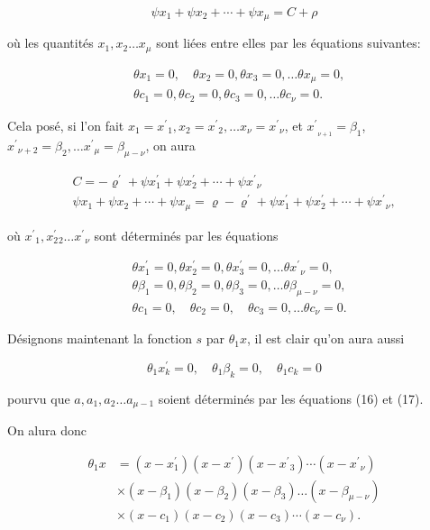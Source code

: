 \documentclass{article}
\begin{document}
\[
\psi x_{1}+\psi x_{2}+\cdots+\psi x_{\mu}=C+\rho
\]

où les quantités \(x_{1}, x_{2} \ldots x_{\mu}\) sont liées entre elles par les équations suivantes:

\[
\begin{aligned}
& \theta x_{1}=0, \quad \theta x_{2}=0, \theta x_{3}=0, \ldots \theta x_{\mu}=0, \\
& \theta c_{1}=0, \theta c_{2}=0, \theta c_{3}=0, \ldots \theta c_{\nu}=0 .
\end{aligned}
\]

Cela posé, si l'on fait \(x_{1}=x^{\prime}{ }_{1}, x_{2}=x^{\prime}{ }_{2}, \ldots x_{\nu}=x^{\prime}{ }_{\nu}\), et \({x^{\prime}}_{{ }_{\nu+1}}=\beta_{1}\), \(x^{\prime}{ }_{\nu+2}=\beta_{2}, \ldots x^{\prime}{ }_{\mu}=\beta_{\mu-\nu}\), on aura

\[
\begin{gathered}
C=-\varrho^{\prime}+\psi x_{1}^{\prime}+\psi x_{2}^{\prime}+\cdots+\psi x^{\prime}{ }_{\nu} \\
\psi x_{1}+\psi x_{2}+\cdots+\psi x_{\mu}=\varrho-\varrho^{\prime}+\psi x_{1}^{\prime}+\psi x_{2}^{\prime}+\cdots+\psi x^{\prime}{ }_{\nu},
\end{gathered}
\]

où \(x^{\prime}{ }_{1}, x_{2}^{\prime}{ }_{2} \ldots x^{\prime}{ }_{\nu}\) sont déterminés par les équations

\[
\begin{aligned}
& \theta x_{1}^{\prime}=0, \theta x_{2}^{\prime}=0, \theta x_{3}^{\prime}=0, \ldots \theta x^{\prime}{ }_{\nu}=0, \\
& \theta \beta_{1}=0, \theta \beta_{2}=0, \theta \beta_{3}=0, \ldots \theta \beta_{\mu-\nu}=0, \\
& \theta c_{1}=0, \quad \theta c_{2}=0, \quad \theta c_{3}=0, \ldots \theta c_{\nu}=0 .
\end{aligned}
\]

Désignons maintenant la fonction \(s\) par \(\theta_{1} x\), il est clair qu'on aura aussi

\[
\theta_{1} x_{k}^{\prime}=0, \quad \theta_{1} \beta_{k}=0, \quad \theta_{1} c_{k}=0
\]

pourvu que \(a, a_{1}, a_{2} \ldots a_{\mu-1}\) soient déterminés par les équations (16) et (17).

On alura donc

\[
\begin{aligned}
\theta_{1} x & =\left(x-x_{1}^{\prime}\right)\left(x-x^{\prime}\right)\left(x-x^{\prime}{ }_{3}\right) \cdots\left(x-x^{\prime}{ }_{\nu}\right) \\
& \times\left(x-\beta_{1}\right)\left(x-\beta_{2}\right)\left(x-\beta_{3}\right) \ldots\left(x-\beta_{\mu-\nu}\right) \\
& \times\left(x-c_{1}\right)\left(x-c_{2}\right)\left(x-c_{3}\right) \cdots\left(x-c_{\nu}\right) .
\end{aligned}
\]
\end{document}
